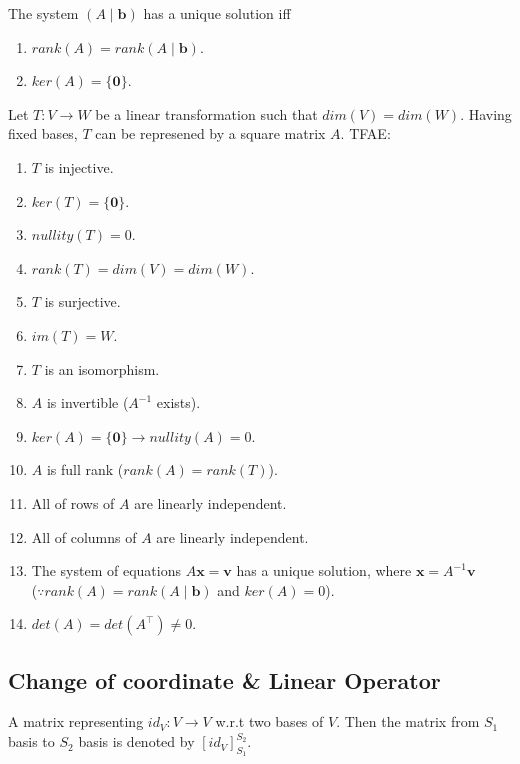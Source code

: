 \documentclass[12pt]{article}
\begin{document}
\begin{corollary}
    The system $(A\mid\mathbf{b})$ has a unique solution iff
    \begin{enumerate}
        \item $rank(A)=rank(A\mid\mathbf{b})$.
        \item $ker(A)=\{\mathbf{0}\}$.
    \end{enumerate}
\end{corollary}

\begin{theorem}[TFAE]
Let $T:V\rightarrow W$ be a linear transformation such that $dim(V)=dim(W)$.
Having fixed bases, $T$ can be represened by a square matrix $A$.
TFAE:
\begin{enumerate}
    \item $T$ is injective.
    \item $ker(T)=\{\mathbf{0}\}$.
    \item $nullity(T)=0$.
    \item $rank(T)=dim(V)=dim(W)$.
    \item $T$ is surjective.
    \item $im(T)=W$.
    \item $T$ is an isomorphism.
    \item $A$ is invertible ($A^{-1}$ exists).
    \item $ker(A)=\{\mathbf{0}\}\rightarrow nullity(A)=0$.
    \item $A$ is full rank ($rank(A)=rank(T)$).
    \item All of rows of $A$ are linearly independent.
    \item All of columns of $A$ are linearly independent.
    \item The system of equations $A\mathbf{x}=\mathbf{v}$ has a unique solution, where $\mathbf{x}=A^{-1}\mathbf{v}$\\
     ($\because rank(A) = rank(A\mid\mathbf{b})$ and $ker(A)=0$).
    \item $det(A)=det(A^\top)\neq 0.$
\end{enumerate}
\label{TFAE_ver1}
\end{theorem}

\subsection{Change of coordinate \& Linear Operator}

\begin{definition}
    A matrix representing $id_V: V\rightarrow V$ w.r.t two bases of $V$.
    Then the matrix from $S_1$ basis to $S_2$ basis is denoted by $[id_V]^{S_2}_{S_1}.$ 
\end{definition}
\end{document}
